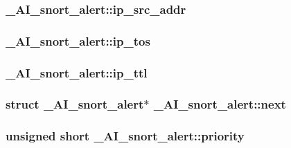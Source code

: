 \label{struct__AI__snort__alert_a5ea7b250ac1c472f3ab57565b6df2536}
\hypertarget{struct__AI__snort__alert_a194117c57a52933d16a97838562bb611}{
\subsubsection[{ip\_\-src\_\-addr}]{ {\bf \_\-AI\_\-snort\_\-alert::ip\_\-src\_\-addr}}}
\label{struct__AI__snort__alert_a194117c57a52933d16a97838562bb611}
\hypertarget{struct__AI__snort__alert_a3f3c47f9baf3229d067504a85873b416}{
\subsubsection[{ip\_\-tos}]{ {\bf \_\-AI\_\-snort\_\-alert::ip\_\-tos}}}
\label{struct__AI__snort__alert_a3f3c47f9baf3229d067504a85873b416}
\hypertarget{struct__AI__snort__alert_a3c9bbe84ec696cd58668a45799a66600}{
\subsubsection[{ip\_\-ttl}]{ {\bf \_\-AI\_\-snort\_\-alert::ip\_\-ttl}}}
\label{struct__AI__snort__alert_a3c9bbe84ec696cd58668a45799a66600}
\hypertarget{struct__AI__snort__alert_aa8336d4b3359015ed8ea312ca1fd1173}{
\subsubsection[{next}]{\setlength{\rightskip}{0pt plus 5cm}struct {\bf \_\-AI\_\-snort\_\-alert}$\ast$ {\bf \_\-AI\_\-snort\_\-alert::next}}}
\label{struct__AI__snort__alert_aa8336d4b3359015ed8ea312ca1fd1173}
\hypertarget{struct__AI__snort__alert_a25661fa4e212c5e30af5e6a892985ec9}{
\subsubsection[{priority}]{\setlength{\rightskip}{0pt plus 5cm}unsigned short {\bf \_\-AI\_\-snort\_\-alert::priority}}}
